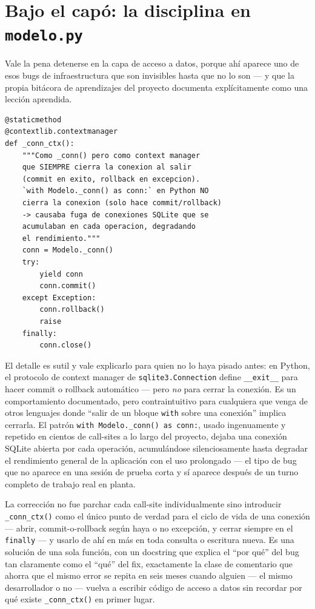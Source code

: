 \documentclass[11pt,twocolumn]{article}
\begin{document}
\section{Bajo el capó: la disciplina en \texttt{modelo.py}}

Vale la pena detenerse en la capa de acceso a datos, porque ahí aparece uno de esos bugs de infraestructura que son invisibles hasta que no lo son --- y que la propia bitácora de aprendizajes del proyecto documenta explícitamente como una lección aprendida.

\begin{lstlisting}[caption={\texttt{modelo.py} --- el fix de fuga de conexiones}]
@staticmethod
@contextlib.contextmanager
def _conn_ctx():
    """Como _conn() pero como context manager
    que SIEMPRE cierra la conexion al salir
    (commit en exito, rollback en excepcion).
    `with Modelo._conn() as conn:` en Python NO
    cierra la conexion (solo hace commit/rollback)
    -> causaba fuga de conexiones SQLite que se
    acumulaban en cada operacion, degradando
    el rendimiento."""
    conn = Modelo._conn()
    try:
        yield conn
        conn.commit()
    except Exception:
        conn.rollback()
        raise
    finally:
        conn.close()
\end{lstlisting}

El detalle es sutil y vale explicarlo para quien no lo haya pisado antes: en Python, el protocolo de context manager de \texttt{sqlite3.Connection} define \texttt{\_\_exit\_\_} para hacer commit o rollback automático --- pero \emph{no} para cerrar la conexión. Es un comportamiento documentado, pero contraintuitivo para cualquiera que venga de otros lenguajes donde ``salir de un bloque \texttt{with} sobre una conexión'' implica cerrarla. El patrón \texttt{with Modelo.\_conn() as conn:}, usado ingenuamente y repetido en cientos de call-sites a lo largo del proyecto, dejaba una conexión SQLite abierta por cada operación, acumulándose silenciosamente hasta degradar el rendimiento general de la aplicación con el uso prolongado --- el tipo de bug que no aparece en una sesión de prueba corta y sí aparece después de un turno completo de trabajo real en planta.

La corrección no fue parchar cada call-site individualmente sino introducir \texttt{\_conn\_ctx()} como el único punto de verdad para el ciclo de vida de una conexión --- abrir, commit-o-rollback según haya o no excepción, y cerrar siempre en el \texttt{finally} --- y usarlo de ahí en más en toda consulta o escritura nueva. Es una solución de una sola función, con un docstring que explica el ``por qué'' del bug tan claramente como el ``qué'' del fix, exactamente la clase de comentario que ahorra que el mismo error se repita en seis meses cuando alguien --- el mismo desarrollador o no --- vuelva a escribir código de acceso a datos sin recordar por qué existe \texttt{\_conn\_ctx()} en primer lugar.
\end{document}
